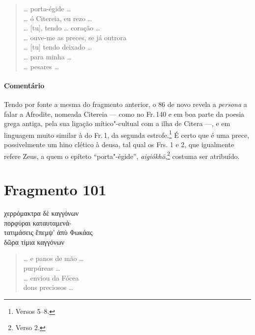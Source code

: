 \begin{verse}
\ldots{} porta-égide \ldots{}\\
\ldots{} ó Citereia, eu rezo \ldots{}\\
\ldots{} [tu], tendo \ldots{} coração \ldots{}\\
\ldots{} ouve-me as preces, se já outrora\\
\ldots{} [tu] tendo deixado \ldots{}\\
\ldots{} para minha \ldots{}\\
\ldots{} pesares \ldots{}
\end{verse}

\medskip

\paragraph{Comentário} Tendo por fonte a mesma do fragmento anterior, o 86 de novo revela a \emph{persona} a falar a Afrodite, nomeada Citereia --- como no Fr.\,140 e em boa parte da poesia grega antiga, pela sua ligação mítico"-cultual com a ilha de Citera ---, e em linguagem muito similar à do Fr.\,1, da segunda estrofe.\footnote{Versos 5--8.} É certo que é uma prece, possivelmente um hino clético à deusa, tal qual os Frs. 1 e 2, que igualmente refere Zeus, a quem o epíteto ``porta"-égide'', \emph{aigiókhō},\footnote{Verso 2.} costuma ser atribuído.



\section{Fragmento 101}

\begin{gkverse}
χερρόμακτρα δὲ \dagger{}καγγόνων\dagger{}\\
πορφύραι \dagger{}καταυταμενἀ-\\
τατιμάσεις\dagger{} ἔπεμψ’ ἀπὺ Φωκάας\\
δῶρα τίμια \dagger{}καγγόνων\dagger{}\\
\end{gkverse}

\begin{verse}
\ldots{} e panos de mão \ldots{}\\
purpúreas \ldots{}\\
\ldots{} enviou da Fócea\\
dons preciosos \ldots{}
\end{verse}

\medskip

